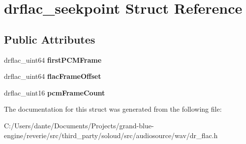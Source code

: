 \hypertarget{structdrflac__seekpoint}{}\section{drflac\+\_\+seekpoint Struct Reference}
\label{structdrflac__seekpoint}
\subsection*{Public Attributes}
\begin{DoxyCompactItemize}
\item 
\mbox{\label{structdrflac__seekpoint_a1b504594b9b7da1617c0bc7908acedb2}} 
drflac\+\_\+uint64 {\bfseries first\+P\+C\+M\+Frame}
\item 
\mbox{\label{structdrflac__seekpoint_a0c9bd08786bcdcc4e5c50e23f7ea9fc9}} 
drflac\+\_\+uint64 {\bfseries flac\+Frame\+Offset}
\item 
\mbox{\label{structdrflac__seekpoint_a19dacb58469b4fff4460496e471421df}} 
drflac\+\_\+uint16 {\bfseries pcm\+Frame\+Count}
\end{DoxyCompactItemize}


The documentation for this struct was generated from the following file\+:\begin{DoxyCompactItemize}
\item 
C\+:/\+Users/dante/\+Documents/\+Projects/grand-\/blue-\/engine/reverie/src/third\+\_\+party/soloud/src/audiosource/wav/dr\+\_\+flac.\+h\end{DoxyCompactItemize}
